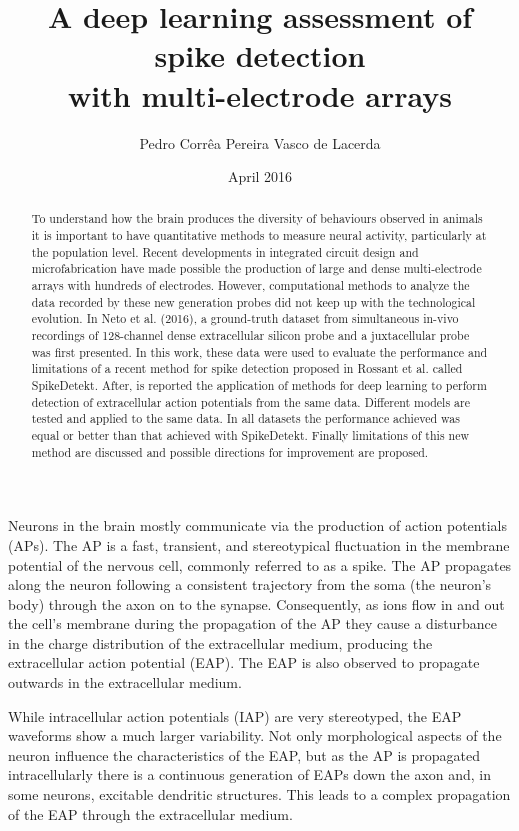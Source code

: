 \documentclass[10pt]{article}
\date{April 2016}
\title{A deep learning assessment of spike detection
\\ with multi-electrode arrays}
\author{Pedro Corrêa Pereira Vasco de Lacerda}
\begin{document}
\maketitle

\begin{abstract}

To understand how the brain produces the diversity of behaviours observed in animals it is important to have quantitative methods to measure neural activity, particularly at the population level. Recent developments in integrated circuit design and microfabrication have made possible the production of large and dense multi-electrode arrays with hundreds of electrodes. However, computational methods to analyze the data recorded by these new generation probes did not keep up with the technological evolution. In Neto et al. (2016), a ground-truth dataset from simultaneous in-vivo recordings of 128-channel dense extracellular silicon probe and a juxtacellular probe was first presented. In this work, these data were used to evaluate the performance and limitations of a recent method for spike detection proposed in Rossant et al. called SpikeDetekt. After, is reported the application of methods for deep learning to perform detection of extracellular action potentials from the same data. Different models are tested and applied to the same data. In all datasets the performance achieved was equal or better than that achieved with SpikeDetekt. Finally limitations of this new method are discussed and possible directions for improvement are proposed.
\end{abstract}


Neurons in the brain mostly communicate via the production of action potentials (APs). The AP is a fast, transient, and stereotypical fluctuation in the membrane potential of the nervous cell, commonly referred to as a spike. The AP propagates along the neuron following a consistent trajectory from the soma (the neuron's body) through the axon on to the synapse. 
Consequently, as ions flow in and out the cell's membrane during the propagation of the AP they cause a disturbance in the charge distribution of the extracellular medium, producing the extracellular action potential (EAP). The EAP is also observed to propagate outwards in the extracellular medium. \cite{kandel}

While intracellular action potentials (IAP) are very stereotyped, the EAP waveforms show a much larger variability. Not only morphological aspects of the neuron influence the characteristics of the EAP, but as the AP is propagated intracellularly there is a continuous generation of EAPs down the axon and, in some neurons, excitable dendritic structures. This leads to a complex propagation of the EAP through the extracellular medium. \cite{gold2007biophysics} \cite{pettersen2008amplitude}
 
\end{document}
